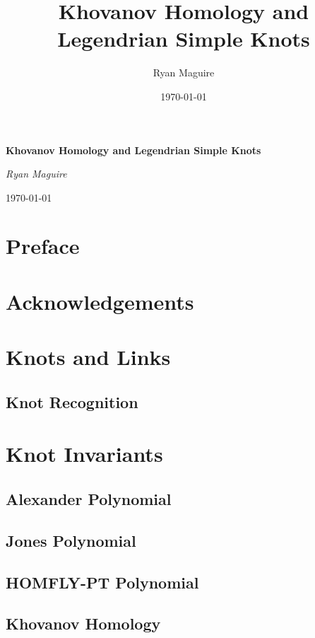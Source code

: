 \documentclass{book}
\title{Khovanov Homology and Legendrian Simple Knots}
\author{Ryan Maguire}
\date{\today}
\theoremstyle{plain}
\theoremstyle{normal}
\begin{document}
    \begin{titlepage}
        \centering
        \LARGE{\bfseries{Khovanov Homology and Legendrian Simple Knots}}
        \par\vspace{3.5cm}
        \par\vspace{4cm}
        \Large{\itshape{Ryan Maguire}}
        \par\vspace{1.5ex}
        \normalsize{\today}
    \end{titlepage}
    \nopagecolor
    \tableofcontents
    \listoffigures
    \listoftables
    \clearpage
    \chapter*{Preface}
    \clearpage
    \chapter*{Acknowledgements}
    \clearpage
    \chapter{Knots and Links}
        
        
        
        \section{Knot Recognition}
    \chapter{Knot Invariants}
        \section{Alexander Polynomial}
        \section{Jones Polynomial}
        \section{HOMFLY-PT Polynomial}
        \section{Khovanov Homology}
\end{document}
